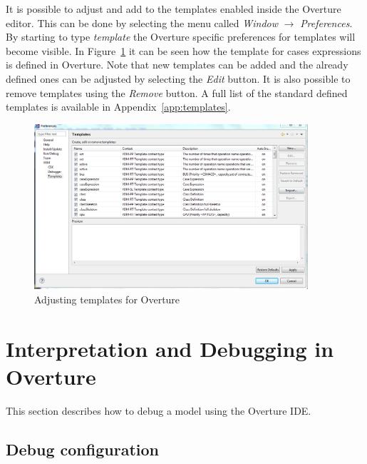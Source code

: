 \documentclass{overturerepchap}
\begin{document}
It is possible to adjust and add to the templates enabled inside the
Overture editor. This can be done by selecting the menu called
\emph{Window} $\rightarrow$ \emph{Preferences}. By starting to type
\emph{template} the Overture specific preferences for templates will
become visible. In Figure~\ref{fig:Templatepreferences} it can be seen
how the template for cases expressions is defined in Overture. Note
that new templates can be added and the already defined ones can be
adjusted by selecting the \emph{Edit} button. It is also possible to
remove templates using the \emph{Remove} button. A full list of the
standard defined templates is available in Appendix~\ref{app:templates}.

\begin{figure}
\begin{center}
\includegraphics[width=4in]{screendumps/templatesRT}
\caption{Adjusting templates for Overture}
\label{fig:Templatepreferences}
\end{center}
\end{figure}

\chapter{Interpretation and Debugging in Overture}\label{sec:debug}

This section describes how to debug a model using the Overture IDE. 

\section{Debug configuration}
\end{document}
